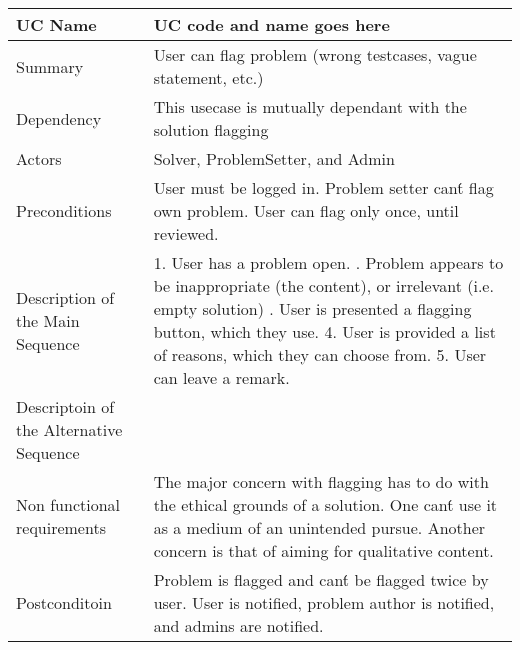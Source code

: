 \begin{table}[htbp]
\centering
\begin{tabularx}{\textwidth}{|l|X|}
\hline
UC Name & UC code and name goes here \\ \hline

Summary &  User can flag problem (wrong testcases, vague statement, etc.) \\ \hline

Dependency & This usecase is mutually dependant with the solution flagging \\ \hline

Actors & Solver, ProblemSetter, and Admin \\ \hline

Preconditions & \- User must be logged in. \newline \- Problem setter can\'t flag own problem. \newline \- User can flag only once, until reviewed. \\ \hline

Description of the Main Sequence & 1. User has a problem open. \newline 2. Problem appears to be inappropriate (the content), or irrelevant (i.e. empty solution) \newline 3. User is presented a flagging button, which they use. 4. User is provided a list of reasons, which they can choose from. 5. User can leave a remark. \\ \hline

Descriptoin of the Alternative Sequence & \- \\ \hline

Non functional requirements & \- The major concern with flagging has to do with the ethical grounds of a solution. One can\'t use it as a medium of an unintended pursue. \newline \- Another concern is that of aiming for qualitative content. \\ \hline

Postconditoin & \- Problem is flagged and can\'t be flagged twice by user. \newline \- User is notified, problem author is notified, and admins are notified. \\ \hline

\end{tabularx}
\end{table}


